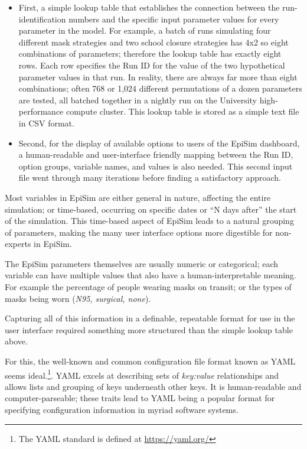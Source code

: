 \begin{itemize}
  \tightlist
  \item
  First, a simple lookup table that establishes the connection between the run-identification numbers and the specific input parameter values for every parameter in the model. For example, a batch of runs simulating four different mask strategies and two school closure strategies has 4x2 so eight combinations of parameters; therefore the lookup table has exactly eight rows. Each row specifies the Run ID for the value of the two hypothetical parameter values in that run. In reality, there are always far more than eight combinations; often 768 or 1,024 different permutations of a dozen parameters are tested, all batched together in a nightly run on the University high-performance compute cluster. This lookup table is stored as a simple text file in CSV format.
  \item
  Second, for the display of available options to users of the EpiSim dashboard, a human-readable and user-interface friendly mapping between the Run ID, option groups, variable names, and values is also needed. This second input file went through many iterations before finding a satisfactory approach.
\end{itemize}

Most variables in EpiSim are either general in nature, affecting the entire simulation; or time-based, occurring on specific dates or ``N days after'' the start of the simulation. This time-based aspect of EpiSim leads to a natural grouping of parameters, making the many user interface options more digestible for non-experts in EpiSim.

The EpiSim parameters themselves are usually numeric or categorical; each variable can have multiple values that also have a human-interpretable meaning. For example the percentage of people wearing masks on transit; or the types of masks being worn (\emph{N95, surgical, none}).

Capturing all of this information in a definable, repeatable format for use in the user interface required something more structured than the simple lookup table above.

For this, the well-known and common configuration file format known as \gls{YAML} seems ideal.\footnote{The YAML standard is defined at \url{https://yaml.org/}}. YAML excels at describing sets of \emph{key:value} relationships and allows lists and grouping of keys underneath other keys. It is human-readable and computer-parseable; these traits lead to YAML being a popular format for specifying configuration information in myriad software systems.

